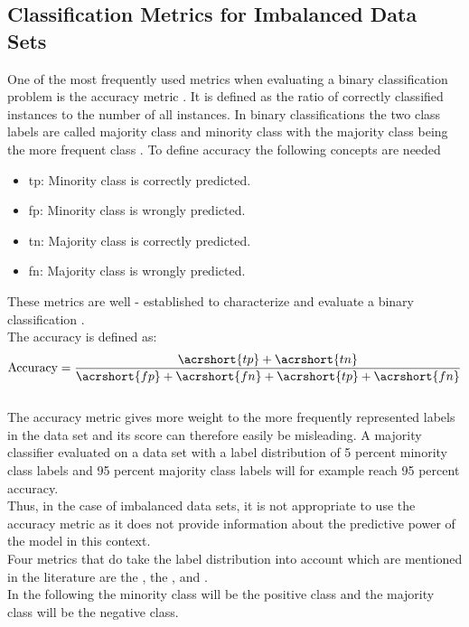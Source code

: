 \subsection{Classification Metrics for Imbalanced Data Sets}
\label{sec:metrics}
One of the most frequently used metrics when evaluating a binary classification problem is the accuracy metric \cite{tharwat2020classification}. It is defined as the ratio of correctly classified instances to the number of all instances. In binary classifications the two class labels are called majority class and minority class with the majority class being the more frequent class \cite{hossin2015review}. To define accuracy the following concepts are needed
\begin{itemize}
    \item \acrfull{tp}: Minority class is correctly predicted.
    \item \acrfull{fp}: Minority class is wrongly predicted.
    \item \acrfull{tn}: Majority class is correctly predicted.
    \item \acrfull{fn}: Majority class is wrongly predicted.
\end{itemize}
These metrics are well - established to characterize and evaluate a binary classification \cite{tharwat2020classification}. \\
The accuracy is defined as:
\begin{equation}
    \text{Accuracy} = \frac{\acrshort{tp} + \acrshort{tn}}{\acrshort{fp} + \acrshort{fn} + \acrshort{tp} + \acrshort{fn}}
\end{equation}\\
The accuracy metric gives more weight to the more frequently represented labels in the data set and its score can therefore easily be misleading. A majority classifier evaluated on a data set with a label distribution of 5 percent minority class labels and 95 percent majority class labels will for example reach 95 percent accuracy.\\
Thus, in the case of imbalanced data sets, it is not appropriate to use the accuracy metric as it does not provide information about the predictive power of the model in this context.\\
Four metrics that do take the label distribution into account which are mentioned in the literature are the , the ,  and  \cite{he2009learning}.\\
In the following the minority class will be the positive class and the majority class will be the negative class.\\ 
